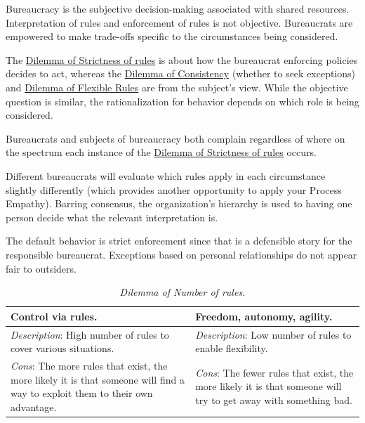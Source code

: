 Bureaucracy is the subjective decision-making associated with shared resources. Interpretation of rules and enforcement of rules is not objective. Bureaucrats are empowered to make trade-offs specific to the circumstances being considered.


The 
\hyperref[table:dilemma-personal-rule-strictness-lax]{Dilemma of Strictness of rules} 
is about how the bureaucrat enforcing policies decides to act, whereas the
\hyperref[table:dilemma-subject-consistency-per-situation]{Dilemma of Consistency} 
(whether to seek exceptions) and
\hyperref[table:dilemma-subject-flexibility]{Dilemma of Flexible Rules}
are from the subject's view. While the objective question is similar, the rationalization for behavior depends on which role is being considered.

Bureaucrats and subjects of bureaucracy both complain regardless of where on the spectrum each instance of the \hyperref[table:dilemma-personal-rule-strictness-lax]{Dilemma of Strictness of rules} occurs. 

Different bureaucrats will evaluate which rules apply in each circumstance slightly differently (which provides another opportunity to apply your Process Empathy). Barring consensus, the organization's hierarchy is used to having one person decide what the relevant interpretation is.

The default behavior is strict enforcement since that is a defensible story for the responsible bureaucrat. Exceptions based on personal relationships do not appear fair to outsiders.


\begin{center}
\begin{table}[H] %
\begin{tabular}{ | m{\dilemmatablewidth}| m{\dilemmatablewidth} | } 
  \hline
  \textbf{Control via rules.} & 
  \textbf{Freedom, autonomy, agility.} \\ 
  \hline
  \textit{Description}: High number of rules to cover various situations. & 
  \textit{Description}: Low number of rules to enable flexibility. \\ 
  \hline
  \textit{Cons}: The more rules that exist, the more likely it is that someone will find a way to exploit them to their own advantage. & 
  \textit{Cons}: The fewer rules that exist, the more likely it is that someone will try to get away with something bad. \\  
  \hline
\end{tabular}
\caption{
\textit{Dilemma of Number of rules.}
}
\label{table:dilemma-personal-number-of-rules}
\end{table}
\end{center}



